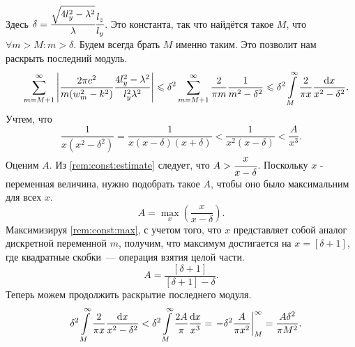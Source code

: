 Здесь $\delta{} = \cfrac{\sqrt{4l_y^2 - \lambda^2}}{\lambda}\cfrac{l_z}{l_y}$. Это константа, так что найдётся такое $M$, что \\$\forall m > M \colon m > \delta{}$. Будем всегда брать $M$ именно таким. Это позволит нам раскрыть последний модуль.
\begin{eqnarray*}
  & &\sum \limits_{m=M+1}^{\infty} \left| \frac{2\pi c^2}{m(w_m^2 - k^2)} \frac{4l_y^2 - \lambda^2}{l_y^2\lambda^2} \right| \leqslant \delta{}^2 \sum \limits_{m=M+1}^{\infty} \frac{2}{\pi m} \frac{1}{m^2 - \delta{}^2} \leqslant \delta{}^2 \int \limits_M^{\infty} \frac{2}{\pi x} \frac{\mathrm{d} x}{x^2 - \delta{}^2}.
\end{eqnarray*}
Учтем, что
\begin{equation}
  \label{rem:const:estimate}
  \frac{1}{x(x^2 - \delta^2)} = \frac{1}{x(x - \delta)(x + \delta)} < \frac{1}{x^2(x - \delta)} < \frac{A}{x^3}.
\end{equation}
Оценим $A$. Из \eqref{rem:const:estimate} следует, что $A > \cfrac{x}{x - \delta}$. Поскольку $x$ - переменная величина, нужно подобрать такое $A$, чтобы оно было максимальним для всех $x$. 
\begin{equation}
  \label{rem:const:max}
  A = \max\limits_{x}\left(\frac{x}{x - \delta}\right).
\end{equation}
Максимизируя \eqref{rem:const:max}, с учетом того, что $x$ представляет собой аналог дискретной переменной $m$, получим, что максимум достигается на $x = [\delta + 1]$, где квадратные скобки~--- операция взятия целой части.
\[
  A = \frac{\left[\delta + 1\right]}{\left[\delta + 1\right] - \delta}.
\]
Теперь можем продолжить раскрытие последнего модуля.
\begin{eqnarray*}
 && \delta{}^2 \int \limits_M^{\infty} \frac{2}{\pi x} \frac{\mathrm{d} x}{x^2 - \delta{}^2} < \delta{}^2 \int \limits_M^{\infty} \frac{2A}{\pi} \frac{\mathrm{d} x}{x^3} = \left. -\delta{}^2\frac{A}{\pi x^2} \right|_M^{\infty} = \frac{A\delta^2}{\pi M^2}.
\end{eqnarray*}

